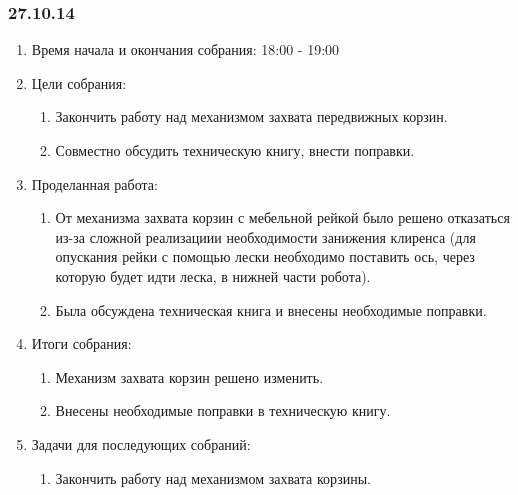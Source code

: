 	
\subsubsection{27.10.14}

\begin{enumerate}
	\item Время начала и окончания собрания:
	18:00 - 19:00
	\item Цели собрания:
	\begin{enumerate}
	  \item Закончить работу над механизмом захвата передвижных корзин.
	  
	  \item Совместно обсудить техническую книгу, внести поправки.
	  
    \end{enumerate}
    
	\item Проделанная работа:
	\begin{enumerate}
	  \item От механизма захвата корзин с мебельной рейкой было решено отказаться из-за сложной реализациии необходимости занижения клиренса (для опускания рейки с помощью лески необходимо поставить ось, через которую будет идти леска, в нижней части робота).
      
      \item Была обсуждена техническая книга и внесены необходимые поправки.
      
    \end{enumerate}
    
	\item Итоги собрания: 
	\begin{enumerate}
	  \item Механизм захвата корзин решено изменить.
	  
	  \item Внесены необходимые поправки в техническую книгу.
      
    \end{enumerate}
    
	\item Задачи для последующих собраний:
	\begin{enumerate}
	  \item Закончить работу над механизмом захвата корзины.
	  
    \end{enumerate}     
\end{enumerate}
\fillpage
